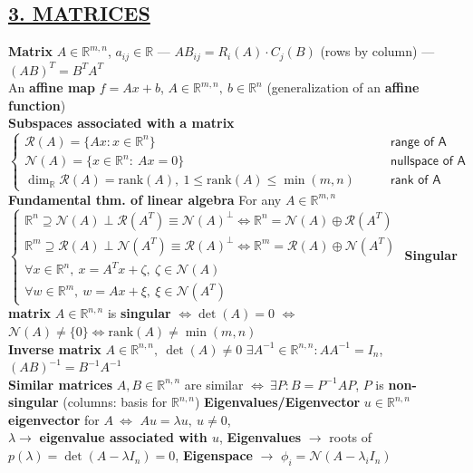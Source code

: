 \documentclass[a4paper]{article}
\begin{document}
\subsection*{\color{cyan} 
\textsf{\underline{3. MATRICES}}}
\textbf{Matrix} $A\in\mathbb{R}^{m,n}$, $a_{ij}\in\mathbb{R}$ --- $AB_{ij}=R_i(A) \cdot C_j(B)$ (rows by column) --- $(AB)^T = B^T A^T$\\
An \textbf{affine map} $f=Ax+b$, $A\in\mathbb{R}^{m,n}, \ b \in \mathbb{R}^n$ (generalization of an \textbf{affine function})\\
\textbf{Subspaces associated with a matrix} $\begin{cases}
    \mathcal{R}(A) = \{Ax: x\in\mathbb{R}^n\} &\qquad \textsf{range of A}\\
    \mathcal{N}(A) = \{x \in \mathbb{R}^n: \ Ax=0\} &\qquad  \textsf{nullspace of A}\\
    \dim_{\mathbb{R}} {\mathcal{R}(A)}=\text{rank}(A), \ 1 \le \text{rank}(A) \le \min(m,n) &\qquad \textsf{rank of A}
\end{cases}$\\
\textbf{Fundamental thm. of linear algebra} For any $A\in\mathbb{R}^{m,n}$ $\begin{cases}
    \mathbb{R}^n\supseteq\mathcal{N}(A) \perp \mathcal{R}(A^T)\equiv\mathcal{N}(A)^{\perp} \iff \mathbb{R}^n = \mathcal{N}(A) \oplus \mathcal{R}(A^T)\\ 
    \mathbb{R}^m\supseteq\mathcal{R}(A) \perp \mathcal{N}(A^T)\equiv\mathcal{R}(A)^{\perp} \iff \mathbb{R}^m = \mathcal{R}(A) \oplus \mathcal{N}(A^T)\\
    \forall x \in \mathbb{R}^n, \ x=A^T{x}+\zeta, \ \zeta \in \mathcal{N}(A)\\
    \forall w \in \mathbb{R}^m, \ w=Ax+\xi, \ \xi \in \mathcal{N}(A^T)
\end{cases}$
\textbf{Singular matrix} $A \in \mathbb{R}^{n,n}$ is \textbf{singular} $\iff \det(A)=0$ $\iff$ $\mathcal{N}(A)\ne\{0\} \iff \text{rank}(A)\ne\min(m,n)$\\
\textbf{Inverse matrix} $A\in\mathbb{R}^{n,n}, \ \det(A)\ne 0$ $\exists A^{-1}\in\mathbb{R}^{n,n}: AA^{-1}=I_n$,
$(AB)^{-1} = B^{-1} A^{-1}$\\
\textbf{Similar matrices} $A,B \in \mathbb{R}^{n,n}$ are similar $\iff \ \exists P: B = P^{-1}A P$, $P$ is \textbf{non-singular} (columns: basis for $\mathbb{R}^{n,n}$) 
\textbf{Eigenvalues/Eigenvector} $u\in\mathbb{R}^{n,n}$ \textbf{eigenvector} for $A \ \iff$ $Au=\lambda u, \ u \ne0$, \\
$\lambda \to$ \textbf{\small{eigenvalue associated with $u$}}, \textbf{Eigenvalues} $\to$ {\tiny{roots of}} $p(\lambda)=\det(A-\lambda{I_n})=0$, \textbf{Eigenspace} $\to$ $\phi_i=\mathcal{N}(A-\lambda_i{I_n})$\\
\end{document}
